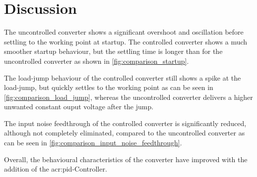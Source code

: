 \chapter{Discussion}
\label{chapter:discussion}
The uncontrolled converter shows a significant overshoot and oscillation before settling to the working point at startup. The controlled converter shows a much smoother startup behaviour, but the settling time is longer than for the uncontrolled converter as shown in \autoref{fig:comparison_startup}.

The load-jump behaviour of the controlled converter still shows a spike at the load-jump, but quickly settles to the working point as can be seen in \autoref{fig:comparison_load_jump}, whereas the uncontrolled converter delivers a higher unwanted constant ouput voltage after the jump.

The input noise feedthrough of the controlled converter is significantly reduced, although not completely eliminated, compared to the uncontrolled converter as can be seen in \autoref{fig:comparison_input_noise_feedthrough}.

Overall, the behavioural characteristics of the converter have improved with the addition of the \Gls{acr:pid}-Controller.

